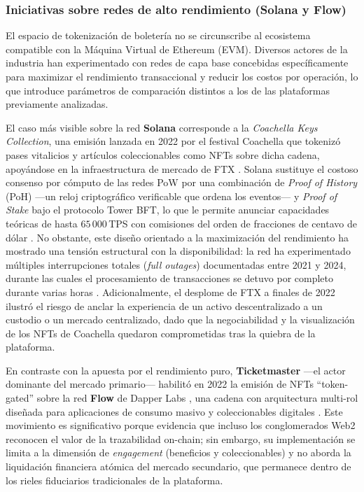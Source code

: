 \subsubsection{Iniciativas sobre redes de alto rendimiento (Solana y Flow)}

El espacio de tokenización de boletería no se circunscribe al ecosistema compatible con la Máquina Virtual de
Ethereum (EVM). Diversos actores de la industria han experimentado con redes de capa base concebidas
específicamente para maximizar el rendimiento transaccional y reducir los costos por operación, lo que
introduce parámetros de comparación distintos a los de las plataformas previamente analizadas.

El caso más visible sobre la red \textbf{Solana} corresponde a la \textit{Coachella Keys Collection}, una
emisión lanzada en 2022 por el festival Coachella que tokenizó pases vitalicios y artículos coleccionables
como NFTs sobre dicha cadena, apoyándose en la infraestructura de mercado de FTX \cite{coachella2022}. Solana
sustituye el costoso consenso por cómputo de las redes PoW por una combinación de \textit{Proof of History}
(PoH) ---un reloj criptográfico verificable que ordena los eventos--- y \textit{Proof of Stake} bajo el
protocolo Tower BFT, lo que le permite anunciar capacidades teóricas de hasta $65\,000$\,TPS con comisiones
del orden de fracciones de centavo de dólar \cite{solana2024}. No obstante, este diseño orientado a la
maximización del rendimiento ha mostrado una tensión estructural con la disponibilidad: la red ha
experimentado múltiples interrupciones totales (\textit{full outages}) documentadas entre 2021 y 2024,
durante las cuales el procesamiento de transacciones se detuvo por completo durante varias horas
\cite{helius2024solana}. Adicionalmente, el desplome de FTX a finales de 2022 ilustró el riesgo de anclar la
experiencia de un activo descentralizado a un custodio o un mercado centralizado, dado que la negociabilidad
y la visualización de los NFTs de Coachella quedaron comprometidas tras la quiebra de la plataforma.

En contraste con la apuesta por el rendimiento puro, \textbf{Ticketmaster} ---el actor dominante del mercado
primario--- habilitó en 2022 la emisión de NFTs ``token-gated'' sobre la red \textbf{Flow} de Dapper Labs
\cite{ticketmasterflow2022}, una cadena con arquitectura multi-rol diseñada para aplicaciones de consumo
masivo y coleccionables digitales \cite{flow2024}. Este movimiento es significativo porque evidencia que
incluso los conglomerados Web2 reconocen el valor de la trazabilidad on-chain; sin embargo, su
implementación se limita a la dimensión de \textit{engagement} (beneficios y coleccionables) y no aborda la
liquidación financiera atómica del mercado secundario, que permanece dentro de los rieles fiduciarios
tradicionales de la plataforma.

